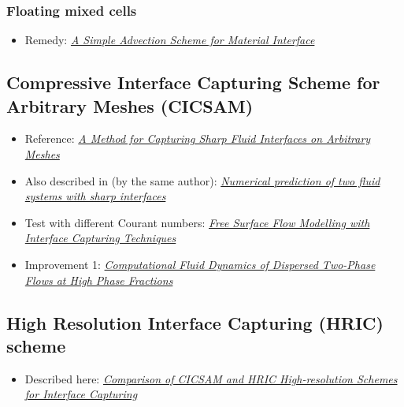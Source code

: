 \subsubsection{Floating mixed cells}

\begin{itemize}
    \item Remedy: \textit{\href{https://e-reports-ext.llnl.gov/pdf/245038.pdf}{A Simple Advection Scheme for Material Interface}}
\end{itemize}

\subsection{Compressive Interface Capturing Scheme for Arbitrary Meshes (CICSAM)}

\begin{itemize}
    \item Reference: \textit{\href{http://ac.els-cdn.com/S0021999199962769/1-s2.0-S0021999199962769-main.pdf?_tid=85161b57da5f4401e55c9d07495e24ea&acdnat=1336167249_a59e4f578adbacf3bff69936c48cdd57}{A Method for Capturing Sharp Fluid Interfaces on Arbitrary Meshes}}
    \item Also described in (by the same author): \textit{\href{http://powerlab.fsb.hr/ped/kturbo/OpenFOAM/docs/OnnoUbbinkPhD.pdf}{Numerical prediction of two fluid systems with sharp interfaces}}
    \item Test with different Courant numbers: \textit{\href{http://www.marin.nl/upload_mm/8/2/c/1807524470_1999999096_2007-ECCOMAS_HoekstraVazAbeilBunnik.pdf}{Free Surface Flow Modelling with Interface Capturing Techniques}}
    \item Improvement 1: \textit{\href{http://powerlab.fsb.hr/ped/kturbo/openfoam/docs/HenrikRuschePhD2002.pdf}{Computational Fluid Dynamics of Dispersed Two-Phase Flows at High Phase Fractions}}
\end{itemize}

\subsection{High Resolution Interface Capturing (HRIC) scheme}

\begin{itemize}
    \item Described here: \textit{\href{http://warminski.pollub.plwww.ptmts.org.pl/Waclaw-Koron-2-08.pdf}{Comparison of CICSAM and HRIC High-resolution Sche\-mes for Interface Capturing}}
\end{itemize}

